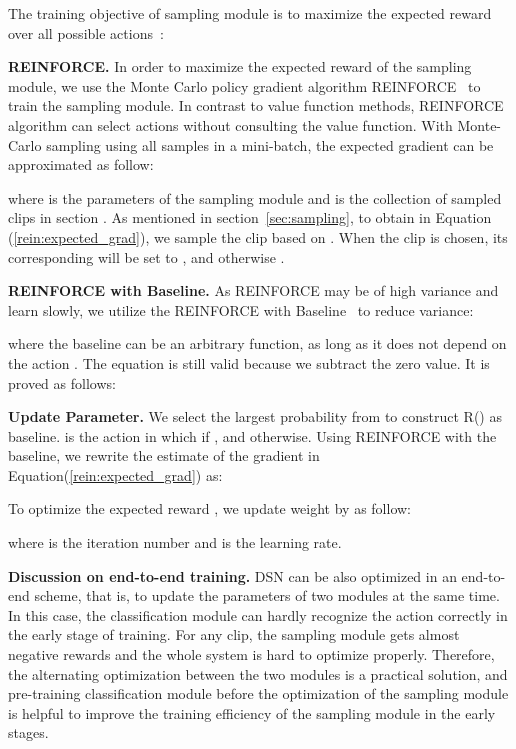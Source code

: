 \documentclass[journal]{IEEEtran}
\begin{document}
The training objective of sampling module is to maximize the expected reward over all possible actions~\cite{SuttonB98}:


\textbf{REINFORCE.} In order to maximize the expected reward of the sampling module, we use the Monte Carlo policy gradient algorithm REINFORCE~\cite{SuttonB98} to train the sampling module.
In contrast to value function methods, REINFORCE algorithm can select actions without consulting the value function.
With Monte-Carlo sampling using all samples in a mini-batch, the expected gradient can be approximated as follow:

where  is the parameters of the sampling module and  is the collection of sampled clips in section .
As mentioned in section~\ref{sec:sampling}, to obtain  in Equation (\ref{rein:expected_grad}), we sample the clip based on .
When the clip  is chosen, its corresponding  will be set to , and otherwise .


\textbf{REINFORCE with Baseline.}
As REINFORCE may be of high variance and learn slowly, we utilize the REINFORCE with Baseline~\cite{SuttonB98} to reduce variance:

where the baseline  can be an arbitrary function, as long as it does not depend on the action .
The equation is still valid because we subtract the zero value.
It is proved as follows:




\textbf{Update Parameter.} We select the largest probability  from  to construct R() as baseline.  is the action in which  if , and  otherwise.
Using REINFORCE with the baseline, we rewrite the estimate of the gradient  in Equation(\ref{rein:expected_grad}) as:



To optimize the expected reward , we update weight  by   as follow:

where  is the iteration number and  is the learning rate.

{\bf Discussion on end-to-end training.}
DSN can be also optimized in an end-to-end scheme, that is, to update the parameters of two modules at the same time.
In this case, the classification module can hardly recognize the action correctly in the early stage of training. For any clip, the sampling module gets almost negative rewards and the whole system is hard to optimize properly.
Therefore, the alternating optimization between the two modules is a practical solution, and pre-training classification module before the optimization of the sampling module is helpful to improve the training efficiency of the sampling module in the early stages.
\end{document}
